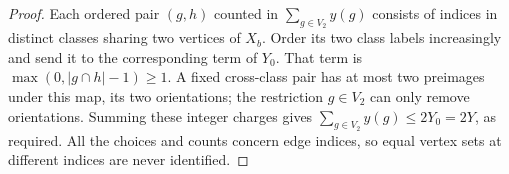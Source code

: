\begin{proof}
Each ordered pair $(g,h)$ counted in $\sum_{g\in V_2}y(g)$ consists of
indices in distinct classes sharing two vertices of $X_b$.
Order its two class labels increasingly and send it to the corresponding
term of $Y_0$. That term is
$\max(0,|g\cap h|-1)\ge1$. A fixed cross-class pair has at most two
preimages under this map, its two orientations; the restriction
$g\in V_2$ can only remove orientations. Summing these integer charges
gives $\sum_{g\in V_2}y(g)\le2Y_0=2Y$, as required. All the choices and
counts concern edge indices, so equal vertex sets at different indices
are never identified.
\end{proof}
